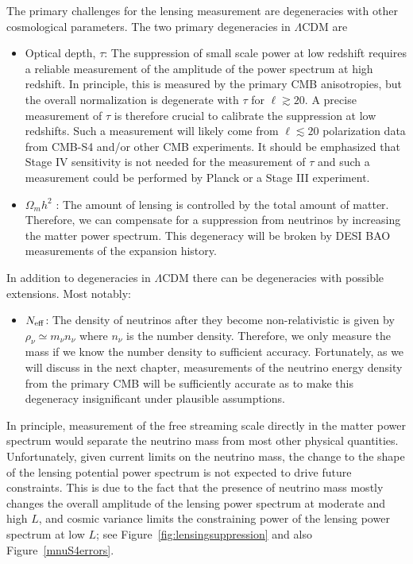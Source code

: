 The primary challenges for the lensing measurement are degeneracies with other cosmological parameters.  The two primary degeneracies in $\Lambda$CDM are
\begin{itemize}
\item Optical depth, $\tau$: The suppression of small scale power at low redshift requires a reliable measurement of the amplitude of the power spectrum at high redshift.  In principle, this is measured by the primary CMB anisotropies, but the overall normalization is degenerate with $\tau$ for $\ell \gtrsim 20$.  A precise measurement of $\tau$ is therefore crucial to calibrate the suppression at low redshifts.  Such a measurement will likely come from $\ell \lesssim 20$ polarization data from CMB-S4 and/or other CMB experiments.  It should be emphasized that Stage IV sensitivity is not needed for the measurement of $\tau$ and such a measurement could be performed by Planck or a Stage III experiment.


\item $\Omega_m h^2$ : The amount of lensing is controlled by the total amount of matter.  Therefore, we can compensate for a suppression from neutrinos by increasing the matter power spectrum.  This degeneracy will be broken by DESI BAO measurements of the expansion history.
\end{itemize}
In addition to degeneracies in $\Lambda$CDM there can be degeneracies with possible extensions.  Most notably:
\begin{itemize}
\item $N_{\rm eff}$: The density of neutrinos after they become non-relativistic is given by $\rho_\nu \simeq m_\nu n_\nu$ where $n_\nu$ is the number density.  Therefore, we only measure the mass if we know the number density to sufficient accuracy.  Fortunately, as we will discuss in the next chapter, measurements of the neutrino energy density from the primary CMB will be sufficiently accurate as to make this degeneracy insignificant under plausible assumptions.
\end{itemize}
In principle, measurement of the free streaming scale directly in the matter power spectrum would separate the neutrino mass from most other physical quantities.  Unfortunately, given current limits on the neutrino mass, the change to the shape of the lensing potential power spectrum is not expected to drive future constraints.  This is due to the fact that the presence of neutrino mass mostly changes the overall amplitude of the lensing power spectrum at moderate and high $L$, and cosmic variance limits the constraining power of the lensing power spectrum at low $L$; see Figure~\ref{fig:lensingsuppression} and also Figure~\ref{mnuS4errors}.


